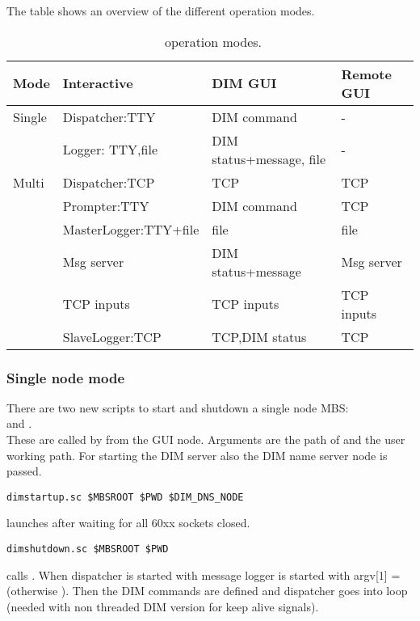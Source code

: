 The table  shows an overview of the different operation modes.
\begin{table}[h]
\begin{center}
\begin{tabular}{|p{2.0cm}|p{4.0cm}|p{4.0cm}|p{2cm}|}      \hline
Mode   & Interactive      & DIM GUI     & Remote GUI \\ \hline
Single & Dispatcher:TTY   & DIM command & - \\ \hline
       & Logger: TTY,file & DIM status+message, file & - \\ \hline
Multi  & Dispatcher:TCP   & TCP & TCP \\ \hline
       & Prompter:TTY     & DIM command & TCP \\ \hline
       & MasterLogger:TTY+file & file & file \\ \hline
       & Msg server       & DIM status+message & Msg server \\ \hline
       & TCP inputs       & TCP inputs & TCP inputs \\ \hline
       & SlaveLogger:TCP  & TCP,DIM status & TCP \\ \hline
\end{tabular}
\end{center}
\caption{\mbs\ operation modes.}
\label{prog:mbs-modes}
\end{table}
\subsubsection{Single node mode}
There are two new scripts to start and shutdown a single node MBS: \\
 and . \\
These are called by  from the GUI node. Arguments are the path of  and the user working path. For starting the DIM server also the DIM name server node is passed.
\begin{verbatim}
dimstartup.sc $MBSROOT $PWD $DIM_DNS_NODE 
\end{verbatim}
launches  after waiting for all 60xx sockets closed.
\begin{verbatim}
dimshutdown.sc $MBSROOT $PWD 
\end{verbatim}
calls .
When dispatcher is started with  message logger is started with argv[1] =  (otherwise ). Then the DIM commands are defined and dispatcher goes into 
 loop (needed with non threaded DIM version for keep alive signals).

